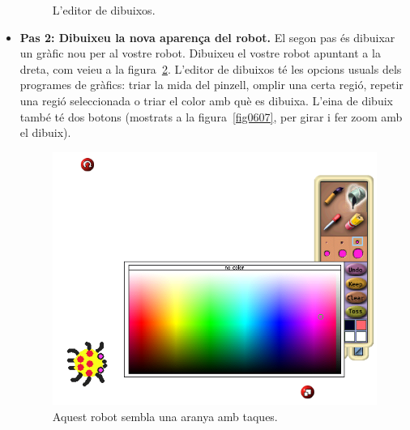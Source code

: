 \begin{itemize}
\begin{figure}[h]
\begin{center}
\end{center}
\caption{L'editor de dibuixos.}
\label{fig0605}
\end{figure}
 
 \item[] \textbf{Pas 2: Dibuixeu la nova aparença del robot.} El segon pas és dibuixar un gràfic nou per al vostre robot. Dibuixeu el vostre robot apuntant a la dreta, com veieu a la figura~\ref{fig0606}. L'editor de dibuixos té les opcions usuals dels programes de gràfics: triar la mida del pinzell, omplir una certa regió, repetir una regió seleccionada o triar el color amb què es dibuixa. L'eina de dibuix també té dos botons (mostrats a la figura~\ref{fig0607}, per girar i fer zoom amb el dibuix).  
\begin{figure}[h!]
\begin{center}
\includegraphics[scale=1.35]{Imatges/figura6-6.png} 
\end{center}
\caption{Aquest robot sembla una aranya amb taques.}
\label{fig0606}
\end{figure}


\end{itemize}
